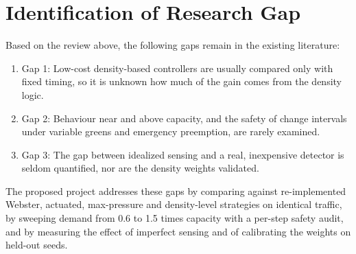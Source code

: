 \section{Identification of Research Gap}
Based on the review above, the following gaps remain in the existing literature:
\begin{enumerate}
  \item Gap 1: Low-cost density-based controllers are usually compared only with fixed timing, so it is unknown how much of the gain comes from the density logic.
  \item Gap 2: Behaviour near and above capacity, and the safety of change intervals under variable greens and emergency preemption, are rarely examined.
  \item Gap 3: The gap between idealized sensing and a real, inexpensive detector is seldom quantified, nor are the density weights validated.
\end{enumerate}
The proposed project addresses these gaps by comparing against re-implemented Webster, actuated, max-pressure and density-level strategies on identical traffic, by sweeping demand from 0.6 to 1.5 times capacity with a per-step safety audit, and by measuring the effect of imperfect sensing and of calibrating the weights on held-out seeds.
